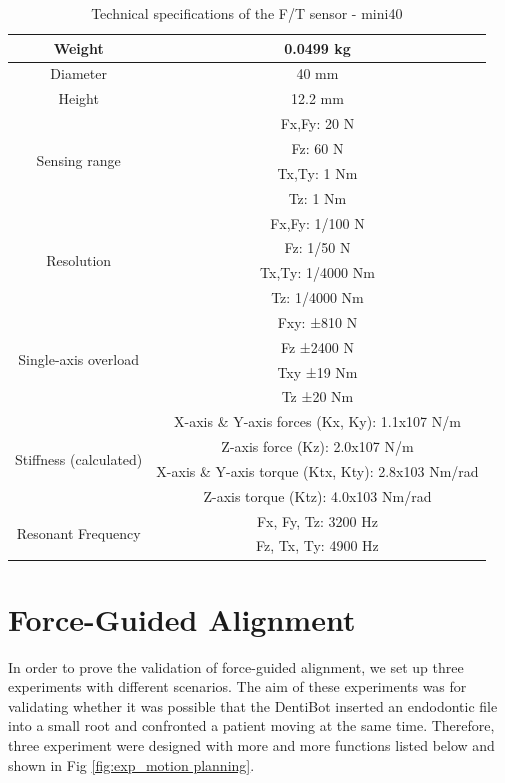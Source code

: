 \begin{table}[htbp]
\centering
\caption{Technical specifications of the F/T sensor - mini40}
\label{tab:mini40_specification}
\par
\begin{tabular}{|c|c|} 
\hline
Weight										&0.0499 kg	\\  \hline
Diameter									&40 mm  	\\ 	\hline
Height										&12.2 mm 	\\	\hline
\multirow{4}{*}{Sensing range}					&Fx,Fy: 20 N\\
											&Fz: 60 N\\
											&Tx,Ty: 1 Nm\\	
											&Tz: 1 Nm\\	\hline
\multirow{4}{*}{Resolution}						&Fx,Fy: 1/100 N	\\
											&Fz: 1/50 N\\
											&Tx,Ty: 1/4000 Nm\\	
											&Tz: 1/4000 Nm\\	\hline										
\multirow{4}{*}{Single-axis overload} 			&Fxy: ±810 N  \\	
											&Fz	±2400 N  \\
											&Txy	±19 Nm  \\
											&Tz	±20 Nm  \\ \hline
\multirow{4}{*}{Stiffness (calculated)}   		&X-axis \& Y-axis forces (Kx, Ky): 1.1x107 N/m   \\	
											&Z-axis force (Kz): 2.0x107 N/m   \\	
											&X-axis \& Y-axis torque (Ktx, Kty): 2.8x103 Nm/rad   \\	
											&Z-axis torque (Ktz): 4.0x103 Nm/rad   \\	 \hline
\multirow{2}{*}{Resonant Frequency} 			&Fx, Fy, Tz: 3200 Hz  \\
											&Fz, Tx, Ty: 4900 Hz  \\
\hline
\end{tabular}
\end{table}

\newpage
\section{Force-Guided Alignment}
\hspace*{6mm}In order to prove the validation of force-guided alignment, we set up three experiments with different scenarios. The aim of these experiments was for validating whether it was possible that the DentiBot inserted an endodontic file into a small root and confronted a patient moving at the same time. Therefore, three experiment were designed with more and more functions listed below and shown in Fig \ref{fig:exp_motion planning}.

